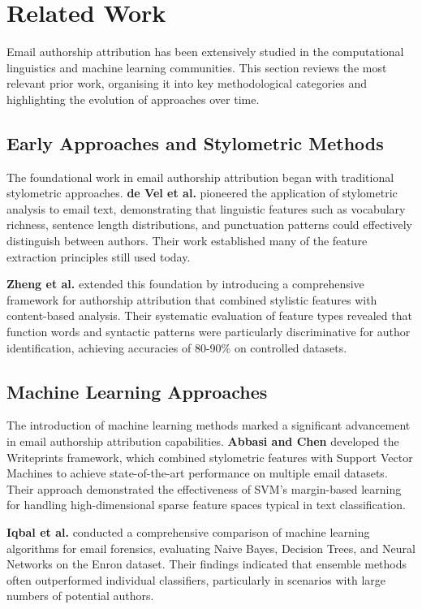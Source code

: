 \documentclass[11pt,a4paper]{article}
\begin{document}
\section{Related Work}

Email authorship attribution has been extensively studied in the computational linguistics and machine learning communities. This section reviews the most relevant prior work, organising it into key methodological categories and highlighting the evolution of approaches over time.

\subsection{Early Approaches and Stylometric Methods}

The foundational work in email authorship attribution began with traditional stylometric approaches. \textbf{de Vel et al.} \cite{devel2001mining} pioneered the application of stylometric analysis to email text, demonstrating that linguistic features such as vocabulary richness, sentence length distributions, and punctuation patterns could effectively distinguish between authors. Their work established many of the feature extraction principles still used today.

\textbf{Zheng et al.} \cite{zheng2006authorship} extended this foundation by introducing a comprehensive framework for authorship attribution that combined stylistic features with content-based analysis. Their systematic evaluation of feature types revealed that function words and syntactic patterns were particularly discriminative for author identification, achieving accuracies of 80-90\% on controlled datasets.

\subsection{Machine Learning Approaches}

The introduction of machine learning methods marked a significant advancement in email authorship attribution capabilities. \textbf{Abbasi and Chen} \cite{abbasi2008writeprints} developed the Writeprints framework, which combined stylometric features with Support Vector Machines to achieve state-of-the-art performance on multiple email datasets. Their approach demonstrated the effectiveness of SVM's margin-based learning for handling high-dimensional sparse feature spaces typical in text classification.

\textbf{Iqbal et al.} \cite{iqbal2013forensic} conducted a comprehensive comparison of machine learning algorithms for email forensics, evaluating Naive Bayes, Decision Trees, and Neural Networks on the Enron dataset. Their findings indicated that ensemble methods often outperformed individual classifiers, particularly in scenarios with large numbers of potential authors.
\end{document}
